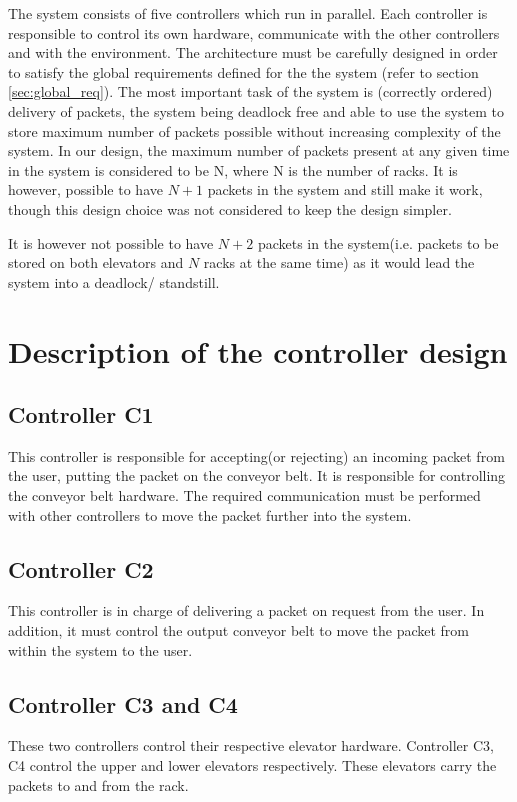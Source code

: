 The system consists of five controllers which run in parallel. Each controller is responsible to control its own hardware, communicate with the other controllers and  with the environment. The architecture must be carefully designed in order to satisfy the global requirements defined for the the system (refer to section \ref{sec:global_req}). The most important task of the system is (correctly ordered) delivery of packets, the system being deadlock free and able to use the system to store maximum number of packets possible without increasing complexity of the system. In our design, the maximum number of packets present at any given time in the system is considered to be N, where N is the number of racks. It is however, possible to have $N+1$ packets in the system and still make it work, though this design choice was not considered to keep the design simpler.

It is however not possible to have $N+2$ packets in the system(i.e. packets to be stored on both elevators and $N$ racks at the same time) as it would lead the system into a deadlock/ standstill.

\section*{Description of the controller design}
\subsection*{Controller \textbf{C1}}
This controller is responsible for accepting(or rejecting) an incoming packet from the user, putting the packet on the conveyor belt. It is responsible for controlling the conveyor belt hardware. The required communication must be performed with other controllers to move the packet further into the system.
\subsection*{Controller \textbf{C2}}
This controller is in charge of delivering a packet on request from the user. In addition, it must control the output conveyor belt to move the packet from within the system to the user.
\subsection*{Controller \textbf{C3 and C4}}
These two controllers control their respective elevator hardware. Controller C3, C4 control the upper and lower elevators respectively.
These elevators carry the packets to and from the rack.
